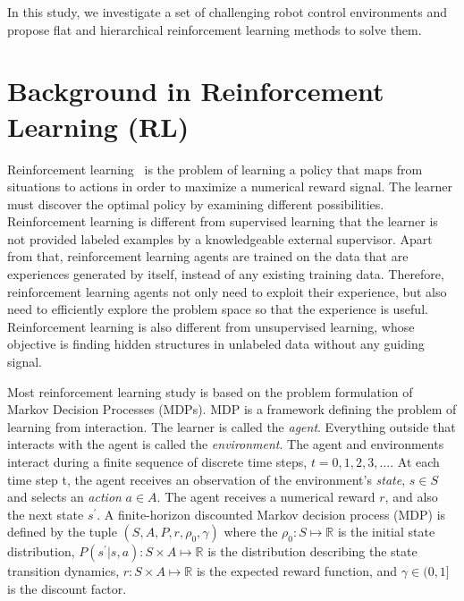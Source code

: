 In this study, we investigate a set of challenging robot control environments and propose flat and hierarchical reinforcement learning methods to solve them.
\section{Background in Reinforcement Learning (RL)}
Reinforcement learning~\cite{sutton1998reinforcement} is the problem of learning a policy that maps from situations to actions in order to maximize a numerical reward signal. The learner must discover the optimal policy by examining different possibilities. Reinforcement learning is different from supervised learning that the learner is not provided labeled examples by a knowledgeable external supervisor. Apart from that, reinforcement learning agents are trained on the data that are experiences generated by itself, instead of any existing training data. Therefore, reinforcement learning agents not only need to exploit their experience, but also need to efficiently explore the problem space so that the experience is useful.  Reinforcement learning is also different from unsupervised learning, whose objective is finding hidden structures in unlabeled data without any guiding signal.

Most reinforcement learning study is based on the problem formulation of Markov Decision Processes (MDPs). MDP is a framework defining the problem of learning from interaction. The learner is called the \textit{agent}. Everything outside that interacts with the agent is called the \textit{environment}.
The agent and environments interact during a finite sequence of discrete time steps, $t=0,1,2,3,...$. At each time step t, the agent receives an observation of the environment's \textit{state}, $s \in S$ and selects an \textit{action} $a \in A$. The agent receives a numerical reward $r$, and also the next state $s^\prime$.  A finite-horizon discounted Markov decision process (MDP) is defined by the tuple $(S,A,P,r,\rho_0,\gamma) $ where the $\rho_0 : S \mapsto \mathbb{R}$ is the initial state distribution, $P(s^\prime|s,a) : S \times A \mapsto \mathbb{R}$ is the distribution describing the state transition dynamics, $r : S \times A \mapsto \mathbb{R}$ is the expected reward function, and $\gamma \in (0,1]$ is the discount factor.

